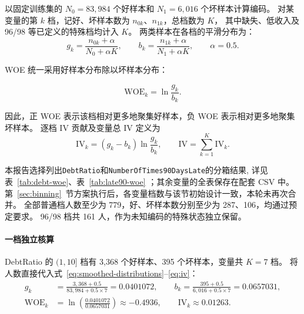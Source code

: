 
以固定训练集的 $N_0=83{,}984$ 个好样本和 $N_1=6{,}016$ 个坏样本计算编码。
对某变量的第 $k$ 档，记好、坏样本数为 $n_{0k}$、$n_{1k}$，总档数为 $K$，
其中缺失、低收入及 96/98 等已定义的特殊档均计入 $K$。
两类样本在各档的平滑分布为：
\begin{equation}
  g_k=\frac{n_{0k}+\alpha}{N_0+\alpha K},\qquad
  b_k=\frac{n_{1k}+\alpha}{N_1+\alpha K},\qquad \alpha=0.5.
  \label{eq:smoothed-distributions}
\end{equation}

WOE 统一采用好样本分布除以坏样本分布：

\begin{equation}
  \mathrm{WOE}_k=\ln\frac{g_k}{b_k}.
  \label{eq:woe}
\end{equation}

因此，正 WOE 表示该档相对更多地聚集好样本，负 WOE 表示相对更多地聚集坏样本。
逐档 IV 贡献及变量总 IV 定义为
\begin{equation}
  \mathrm{IV}_k=(g_k-b_k)\ln\frac{g_k}{b_k},\qquad
  \mathrm{IV}=\sum_{k=1}^{K}\mathrm{IV}_k.
  \label{eq:iv}
\end{equation}

本报告选择列出\texttt{DebtRatio}和\texttt{NumberOfTimes90DaysLate}的分箱结果,
详见表~\ref{tab:debt-woe}、表~\ref{tab:late90-woe}
；其余变量的全表保存在配套 CSV 中。
第~\ref{sec:binning}~节方案执行后，各变量档数与该节初始设计一致，本轮未再次合并。
全部普通档人数至少为 779，好、坏样本数分别至少为 287、106，均通过预定要求。
96/98 档共 161 人，作为未知编码的特殊状态独立保留。

\begin{table}[!htbp]
  \centering
  \caption{DebtRatio 的完整训练分箱表}
  \label{tab:debt-woe}
  \footnotesize
  \setlength{\tabcolsep}{2.2pt}
  \renewcommand{\arraystretch}{1.05}
  
\end{table}

\begin{table}[!htbp]
  \centering
  \caption{NumberOfTimes90DaysLate 的完整训练分箱表}
  \label{tab:late90-woe}
  \footnotesize
  \setlength{\tabcolsep}{2.2pt}
  \renewcommand{\arraystretch}{1.05}
  
\end{table}

\paragraph{一档独立核算}
DebtRatio 的 $(1,10]$ 档有 3,368 个好样本、395 个坏样本，变量共 $K=7$ 档。
将人数直接代入式~\eqref{eq:smoothed-distributions}--\eqref{eq:iv}：
\begin{equation}
  \begin{aligned}
    g_k&=\frac{3{,}368+0.5}{83{,}984+0.5\times7}=0.0401072,\qquad
    b_k=\frac{395+0.5}{6{,}016+0.5\times7}=0.0657031,\\
    \mathrm{WOE}_k&=\ln\!\left(\frac{0.0401072}{0.0657031}\right)\approx-0.4936,\qquad
    \mathrm{IV}_k\approx0.01263.
  \end{aligned}
  \label{eq:woe-hand-check}
\end{equation}

